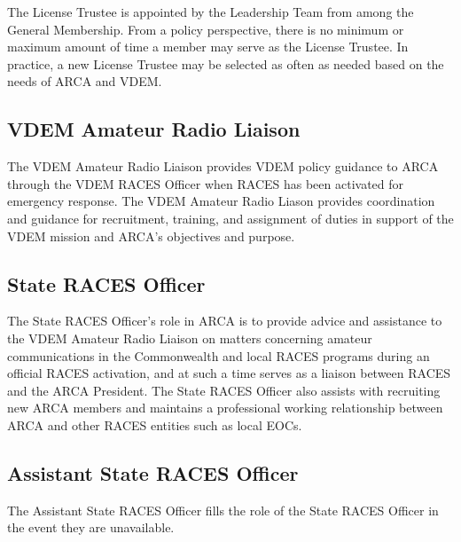 \documentclass[pdflatex,letterpaper,twoside,12pt]{book}
\begin{document}
The License Trustee is appointed by the Leadership Team from among the General Membership.  From a policy perspective, there is no minimum or maximum amount of time a member may serve as the License Trustee.  In practice, a new License Trustee may be selected as often as needed based on the needs of ARCA and VDEM.

\subsection{VDEM Amateur Radio Liaison}

The VDEM Amateur Radio Liaison provides VDEM policy guidance to ARCA through the VDEM RACES Officer when RACES has been activated for emergency response. The VDEM Amateur Radio Liason provides coordination and guidance for recruitment, training, and assignment of duties in support of the VDEM mission and ARCA's objectives and purpose.

\subsection{State RACES Officer}

The State RACES Officer's role in ARCA is to provide advice and assistance to the VDEM Amateur Radio Liaison on matters concerning amateur communications in the Commonwealth and local RACES programs during an official RACES activation, and at such a time serves as a liaison between RACES and the ARCA President.  The State RACES Officer also assists with recruiting new ARCA members and maintains a professional working relationship between ARCA and other RACES entities such as local EOCs.

\subsection{Assistant State RACES Officer}

The Assistant State RACES Officer fills the role of the State RACES Officer in the event they are unavailable.

\end{document}
